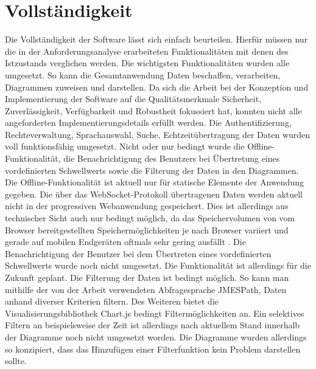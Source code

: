 \section{Vollständigkeit}
\label{sec:vollstaendigkeit}
Die Vollständigkeit der Software lässt sich einfach beurteilen. Hierfür müssen nur die in der Anforderungsanalyse
erarbeiteten Funktionalitäten mit denen des Istzustands verglichen werden. Die wichtigsten Funktionalitäten
wurden alle umgesetzt. So kann die Gesamtanwendung Daten beschaffen, verarbeiten, Diagrammen zuweisen und darstellen.
Da sich die Arbeit bei der Konzeption und Implementierung der Software auf die Qualitätsmerkmale Sicherheit,
Zuverlässigkeit, Verfügbarkeit und Robustheit fokussiert hat, konnten nicht alle angeforderten Implementierungsdetails
erfüllt werden. Die Authentifizierung, Rechteverwaltung, Sprachauswahl, Suche, Echtzeitübertragung der Daten wurden
voll funktionsfähig umgesetzt. Nicht oder nur bedingt wurde die Offline-Funktionalität, die Benachrichtigung
des Benutzers bei Übertretung eines vordefinierten Schwellwerts sowie die Filterung der Daten in den Diagrammen.
Die Offline-Funktionalität ist aktuell nur für statische Elemente der Anwendung gegeben. Die über das WebSocket-Protokoll
übertragenen Daten werden aktuell nicht in der progressiven Webanwendung gespeichert. Dies ist allerdings aus technischer
Sicht auch nur bedingt möglich, da das Speichervolumen von vom Browser bereitgestellten Speichermöglichkeiten
je nach Browser variiert und gerade auf mobilen Endgeräten oftmals sehr gering ausfällt \cite{HTML5RocksStorage}.
Die Benachrichtigung der Benutzer bei dem Übertreten eines vordefinierten Schwellwerts wurde noch nicht umgesetzt.
Die Funktionalität ist allerdings für die Zukunft geplant. Die Filterung der Daten ist bedingt möglich. So kann 
man mithilfe der von der Arbeit verwendeten Abfragesprache JMESPath, Daten anhand diverser Kriterien filtern.
Des Weiteren bietet die Visualisierungsbibliothek Chart.js bedingt Filtermöglichkeiten an. Ein selektives Filtern
an beispielsweise der Zeit ist allerdings nach aktuellem Stand innerhalb der Diagramme noch nicht umgesetzt worden.
Die Diagramme wurden allerdings so konzipiert, dass das Hinzufügen einer Filterfunktion
kein Problem darstellen sollte.

